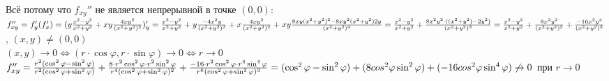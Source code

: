 \begin{remark}
Всё потому что $f_{xy}''$ не является непрерывной в точке $(0, 0)$:\\
$f_{xy}'' = f_{y}'(f_{x}') = 
(y\frac{x^2 - y^2}{x^2 + y^2} + xy \frac{4xy^2}{(x^2 + y^2)^2})_{y}' = 
\frac{x^2 - y^2}{x^2 + y^2} + y\frac{-4x^2y}{(x^2 + y^2)^2} + x\frac{4xy^2}{(x^2 + y^2)^2} + xy\frac{8xy(x^2+y^2)^2 - 8xy^2(x^2+y^2)2y}{(x^2 + y^2)^4} =\\ 
\frac{x^2 - y^2}{x^2 + y^2} + \frac{8x^2y^2\cdot ((x^2+y^2) - 2y^2)}{(x^2 + y^2)^3} = \frac{x^2 - y^2}{x^2 + y^2} + \frac{8x^2y^2}{(x^2 + y^2)^2} + \frac{-16x^2y^4}{(x^2 + y^2)^3}$, $(x, y) \neq (0, 0)$\\
$(x, y) \to 0 \iff (r\cdot \cos{\varphi}, r\cdot \sin{\varphi}) \to 0 \iff r \to 0$\\
$f_{xy}'' = \frac{r^2(\cos^2{\varphi} - \sin^2{\varphi})}{r^2(\cos^2{\varphi} + \sin^2{\varphi})} + \frac{8\cdot r^2\cos^2{\varphi}\cdot r^2\sin^2{\varphi}}{r^4(\cos^2{\varphi} + \sin^2{\varphi})^2} + \frac{-16\cdot r^2\cos^2{\varphi}\cdot r^4\sin^4{\varphi}}{r^6(\cos^2{\varphi} + \sin^2{\varphi})^3} = \\
(\cos^2{\varphi} - \sin^2{\varphi}) + (8cos^2{\varphi}\sin^2{\varphi}) + (-16cos^2{\varphi}\sin^4{\varphi}) \not\to 0$ при $r \to 0$

\end{remark}
